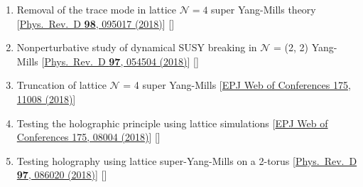 \begin{enumerate}
  \item  Removal of the trace mode in lattice $\mathcal{N }= 4$ super Yang-Mills theory [\href{https://journals.aps.org/prd/abstract/10.1103/PhysRevD.98.095017}{Phys.\ Rev.\ D {\bf 98}, 095017 (2018)}] [\texttt{\textbf{\texttt{}}}]  
 \item Nonperturbative study of dynamical SUSY breaking in $\mathcal{N}$ = (2, 2) Yang-Mills [\href{https://journals.aps.org/prd/abstract/10.1103/PhysRevD.97.054504}{Phys.\ Rev.\ D {\bf 97}, 054504 (2018)}] [\texttt{\textbf{}}]  
 \item Truncation of lattice $\mathcal{N}$ = 4 super Yang-Mills [\href{https://doi.org/10.1051/epjconf/201817511008}{EPJ Web of Conferences 175, 11008 (2018)}] %
\item Testing the holographic principle using lattice simulations  [\href{https://doi.org/10.1051/epjconf/201817508004}{EPJ Web of Conferences 175, 08004 (2018)}] [\texttt{\textbf{}}] %
\item Testing holography using lattice super-Yang-Mills on a 2-torus [\href{https://journals.aps.org/prd/abstract/10.1103/PhysRevD.97.086020}{Phys.\ Rev.\ D {\bf 97}, 086020 (2018)}] [\texttt{\textbf{}}]
\end{enumerate}
